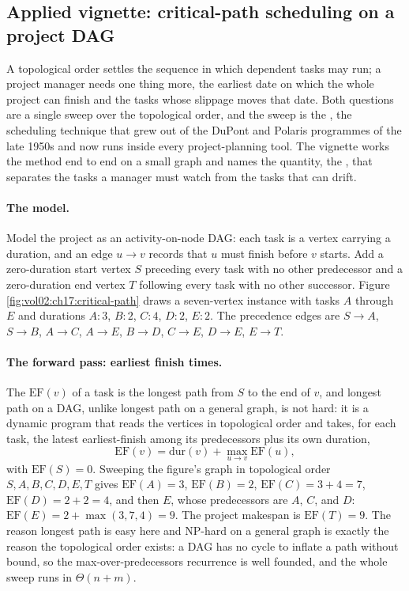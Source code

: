 \subsection{Applied vignette: critical-path scheduling on a project
DAG}

A topological order settles the sequence in which dependent tasks may
run; a project manager needs one thing more, the earliest date on which
the whole project can finish and the tasks whose slippage moves that
date. Both questions are a single sweep over the topological order, and
the sweep is the , the scheduling
technique that grew out of the DuPont and Polaris programmes of the late
1950s and now runs inside every project-planning tool. The vignette
works the method end to end on a small graph and names the quantity, the
, that separates the tasks a manager must watch from the
tasks that can drift.

\paragraph{The model.}
Model the project as an activity-on-node DAG: each task is a vertex
carrying a duration, and an edge $u \to v$ records that $u$ must finish
before $v$ starts. Add a zero-duration start vertex $S$ preceding every
task with no other predecessor and a zero-duration end vertex $T$
following every task with no other successor. Figure
\ref{fig:vol02:ch17:critical-path} draws a seven-vertex instance with
tasks $A$ through $E$ and durations $A{:}3$, $B{:}2$, $C{:}4$, $D{:}2$,
$E{:}2$. The precedence edges are $S \to A$, $S \to B$, $A \to C$,
$A \to E$, $B \to D$, $C \to E$, $D \to E$, $E \to T$.



\paragraph{The forward pass: earliest finish times.}
The  $\mathrm{EF}(v)$ of a task is the longest
path from $S$ to the end of $v$, and longest path on a DAG, unlike
longest path on a general graph, is not hard: it is a dynamic program
that reads the vertices in topological order and takes, for each task,
the latest earliest-finish among its predecessors plus its own duration,
\[
\mathrm{EF}(v) = \mathrm{dur}(v) + \max_{u \to v} \mathrm{EF}(u),
\]
with $\mathrm{EF}(S) = 0$. Sweeping the figure's graph in topological
order $S, A, B, C, D, E, T$ gives $\mathrm{EF}(A) = 3$,
$\mathrm{EF}(B) = 2$, $\mathrm{EF}(C) = 3 + 4 = 7$,
$\mathrm{EF}(D) = 2 + 2 = 4$, and then $E$, whose predecessors are $A$,
$C$, and $D$: $\mathrm{EF}(E) = 2 + \max(3, 7, 4) = 9$. The project
makespan is $\mathrm{EF}(T) = 9$. The reason longest path is easy here
and NP-hard on a general graph is exactly the reason the topological
order exists: a DAG has no cycle to inflate a path without bound, so the
max-over-predecessors recurrence is well founded, and the whole sweep
runs in $\Theta(n + m)$.

